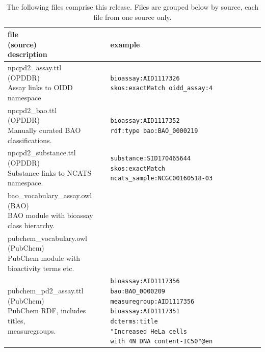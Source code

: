 \begin{singlespace}
\begin{longtable}{p{0.4\linewidth}p{0.6\linewidth}}
\caption{The following files comprise this release.  Files are grouped below by source, each file from one source only.}
\label{tab:opddr_05}\\
\hline
\makecell{\textbf{file} \\ \textbf{(source)} \\ \textbf{description}} & \textbf{example} \\
\hline
\makecell[l]{npcpd2\_assay.ttl \\ (OPDDR) \\ Assay links to OIDD namespace} & \makecell[l]{\texttt{bioassay:AID1117326}\\ \texttt{skos:exactMatch oidd\_assay:4}} \\
\hline
\makecell[l]{npcpd2\_bao.ttl \\ (OPDDR)  \\  Manually curated BAO classifications.} & \makecell[l]{\texttt{bioassay:AID1117352}\\ \texttt{rdf:type bao:BAO\_0000219}} \\
\hline
\makecell[l]{npcpd2\_substance.ttl \\ (OPDDR) \\ Substance links to NCATS namespace.} & \makecell[l]{\texttt{substance:SID170465644}\\ \texttt{skos:exactMatch}\\ \texttt{ncats\_sample:NCGC00160518-03}} \\
\hline
\makecell[l]{bao\_vocabulary\_assay.owl \\ (BAO) \\ BAO module with bioassay class hierarchy.} &  \\
\hline
\makecell[l]{pubchem\_vocabulary.owl \\ (PubChem)  \\  PubChem module with bioactivity terms etc.} & \\
\hline
\makecell[l]{pubchem\_pd2\_assay.ttl \\ (PubChem)  \\  PubChem RDF, includes titles, \\ measuregroups. } & \makecell[l]{\texttt{bioassay:AID1117356}\\ \texttt{bao:BAO\_0000209}\\ \texttt{measuregroup:AID1117356}\\ \texttt{bioassay:AID1117351}\\ \texttt{dcterms:title}\\ \texttt{"Increased HeLa cells}\\ \texttt{with 4N DNA content-IC50"@en}}  \\

\end{longtable}
\end{singlespace}
